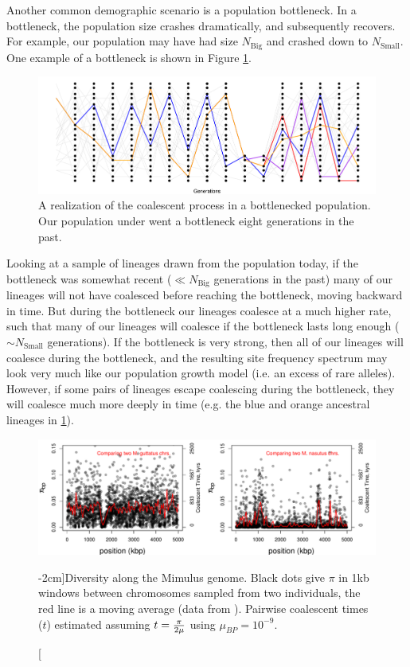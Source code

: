 Another common demographic scenario is a population bottleneck. In a bottleneck, the population size crashes dramatically, and subsequently
recovers. For example, our population may have had size $N_{\textrm{Big}}$
and crashed down to $N_{\textrm{Small}}$. One example of a
bottleneck is shown in Figure \ref{fig:Genealogy_crash}. 
\begin{figure}
\begin{center}
  \includegraphics[width = \textwidth]{figures/Genetic_drift/Demography/Crash_genealogy.pdf}
\end{center}
\caption{A realization of the coalescent process in a bottlenecked population. Our population under went a bottleneck eight generations in the past.} \label{fig:Genealogy_crash}
\end{figure}
Looking at a sample of lineages drawn from the population today, if
the bottleneck was somewhat recent ($\ll N_{\textrm{Big}}$ generations
in the past) many of our lineages will not have coalesced before reaching
the bottleneck, moving backward in time. But during the bottleneck our
lineages coalesce at a much higher rate, such that many of our
lineages will coalesce if the bottleneck lasts long enough
($\sim N_{\textrm{Small}}$ generations). If the bottleneck is very
strong, then all of our lineages will coalesce during the bottleneck, and the resulting site frequency spectrum may
look very much like our population growth model (i.e. an excess of rare
alleles). However, if some pairs of lineages escape coalescing during
the bottleneck, they will coalesce much more deeply in time (e.g. the
blue and orange ancestral lineages in
\ref{fig:Genealogy_crash}). 
\begin{figure}
\begin{center}
  \includegraphics[width = \textwidth]{figures/Genetic_drift/Demography/Mimulus_coalescent_times.pdf}
\end{center}
\caption[][-2cm]{Diversity along the Mimulus genome. Black dots give $\pi$ in 1kb windows between chromosomes sampled from two individuals, the red line is a
  moving average (data from  \citeauthor{brandvain:14}). Pairwise coalescent times ($t$) estimated assuming $t= \nicefrac{\pi}{2 \mu} $ using $\mu_{BP}=10^{-9}$.} \label{fig:Mimulus_bottleneck}
\end{figure}
